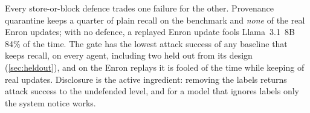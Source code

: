  Every store-or-block defence trades one failure for the other.
Provenance quarantine keeps a quarter of plain recall on the benchmark and \emph{none} of the
real Enron updates; with no defence, a replayed Enron update fools Llama~3.1~8B 84\% of the
time. The \gate{} gate has the lowest attack success of any baseline that keeps recall, on every
agent, including two held out from its design (\cref{sec:heldout}), and on
the Enron replays it is fooled \enronLlamaThy{} of the time while keeping \enronLlamaUpdThy{} of
real updates. Disclosure is the active ingredient: removing the labels returns attack success to
the undefended level, and for a model that ignores labels only the system notice works.
